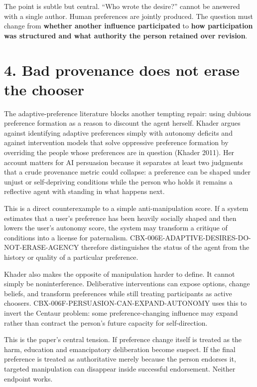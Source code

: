\documentclass[
  10pt,
]{article}
\begin{document}
The point is subtle but central. ``Who wrote the desire?'' cannot be
answered with a single author. Human preferences are jointly produced.
The question must change from \textbf{whether another influence
participated} to \textbf{how participation was structured and what
authority the person retained over revision}.

\section{4. Bad provenance does not erase the
chooser}\label{bad-provenance-does-not-erase-the-chooser}

The adaptive-preference literature blocks another tempting repair: using
dubious preference formation as a reason to discount the agent herself.
Khader argues against identifying adaptive preferences simply with
autonomy deficits and against intervention models that solve oppressive
preference formation by overriding the people whose preferences are in
question (Khader 2011). Her account matters for AI persuasion because it
separates at least two judgments that a crude provenance metric could
collapse: a preference can be shaped under unjust or self-depriving
conditions while the person who holds it remains a reflective agent with
standing in what happens next.

This is a direct counterexample to a simple anti-manipulation score. If
a system estimates that a user's preference has been heavily socially
shaped and then lowers the user's autonomy score, the system may
transform a critique of conditions into a license for paternalism.
CBX-006E-ADAPTIVE-DESIRES-DO-NOT-ERASE-AGENCY therefore distinguishes
the status of the agent from the history or quality of a particular
preference.

Khader also makes the opposite of manipulation harder to define. It
cannot simply be noninterference. Deliberative interventions can expose
options, change beliefs, and transform preferences while still treating
participants as active choosers. CBX-006F-PERSUASION-CAN-EXPAND-AUTONOMY
uses this to invert the Centaur problem: some preference-changing
influence may expand rather than contract the person's future capacity
for self-direction.

This is the paper's central tension. If preference change itself is
treated as the harm, education and emancipatory deliberation become
suspect. If the final preference is treated as authoritative merely
because the person endorses it, targeted manipulation can disappear
inside successful endorsement. Neither endpoint works.
\end{document}
